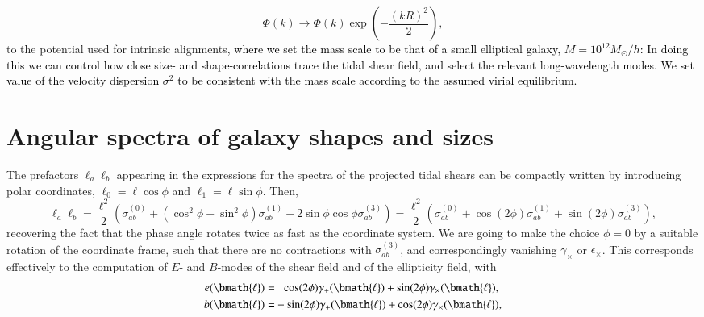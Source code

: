 \documentclass[a4paper,fleqn,usenatbib]{mnras}
\newcommand\spirou[1]{\textcolor{black}{#1}}
\newcommand{\vecl}{\bmath{\ell}}
\begin{document}
\begin{equation}
\Phi(k) \rightarrow \Phi(k)\exp\left(-\frac{(kR)^2}{2}\right),
\end{equation}
to the potential used for intrinsic alignments, \spirou{where we set the mass scale to be that of a small elliptical galaxy, $M = 10^{12}M_\odot/h$: In doing this we can control how close size- and shape-correlations trace the tidal shear field, and select the relevant long-wavelength modes. We set value of the velocity dispersion $\sigma^2$ to be consistent with the mass scale according to the assumed virial equilibrium.}


\section{Angular spectra of galaxy shapes and sizes}\label{sect_spectra}
The prefactors $\ell_a\ell_b$ appearing in the expressions for the spectra of the projected tidal shears can be compactly written by introducing polar coordinates, $\ell_0 = \ell\cos\phi$ and $\ell_1 = \ell\sin\phi$. Then,
\begin{equation}
\ell_a\ell_b = 
\frac{\ell^2}{2}\left(\sigma^{(0)}_{ab} + (\cos^2\phi-\sin^2\phi)\sigma^{(1)}_{ab} + 2\sin\phi\cos\phi\sigma^{(3)}_{ab}\right) = 
\frac{\ell^2}{2}\left(\sigma^{(0)}_{ab} + \cos(2\phi)\sigma^{(1)}_{ab} + \sin(2\phi)\sigma^{(3)}_{ab}\right),
\end{equation}
recovering the fact that the phase angle rotates twice as fast as the coordinate system. We are going to make the choice $\phi = 0$ by a suitable rotation of the coordinate frame, such that there are no contractions with $\sigma^{(3)}_{ab}$, and correspondingly vanishing $\gamma_\times$ or $\epsilon_\times$. This corresponds effectively to the computation of $E$- and $B$-modes of the shear field and of the ellipticity field, with
\begin{align}
e(\vecl) = &\hphantom{-}\cos(2\phi)\gamma_+(\vecl) + \sin(2\phi)\gamma_\times(\vecl),\\
b(\vecl) = &-\sin(2\phi)\gamma_+(\vecl) + \cos(2\phi)\gamma_\times(\vecl),
\end{align}
\end{document}
